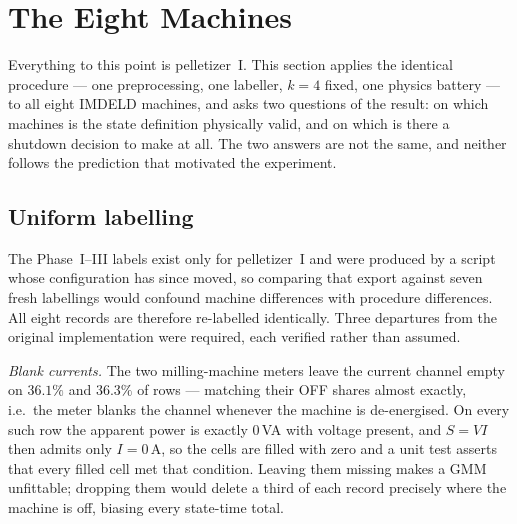 %
%
%

\section{The Eight Machines}
\label{sec:multimachine}

Everything to this point is pelletizer~I. This section applies the
identical procedure --- one preprocessing, one labeller, $k=4$ fixed,
one physics battery --- to all eight IMDELD machines, and asks two
questions of the result: on which machines is the state definition
physically valid, and on which is there a shutdown decision to make at
all. The two answers are not the same, and neither follows the
prediction that motivated the experiment.

\subsection{Uniform labelling}
\label{sec:multimachine:labelling}

The Phase~I--III labels exist only for pelletizer~I and were produced by
a script whose configuration has since moved, so comparing that export
against seven fresh labellings would confound machine differences with
procedure differences. All eight records are therefore re-labelled
identically. Three departures from the original implementation were
required, each verified rather than assumed.

\emph{Blank currents.} The two milling-machine meters leave the current
channel empty on $36.1\%$ and $36.3\%$ of rows --- matching their OFF
shares almost exactly, i.e.\ the meter blanks the channel whenever the
machine is de-energised. On every such row the apparent power is exactly
$0$\,VA with voltage present, and $S=VI$ then admits only $I=0$\,A, so
the cells are filled with zero and a unit test asserts that every filled
cell met that condition. Leaving them missing makes a GMM
unfittable; dropping them would delete a third of each record precisely
where the machine is off, biasing every state-time total.

